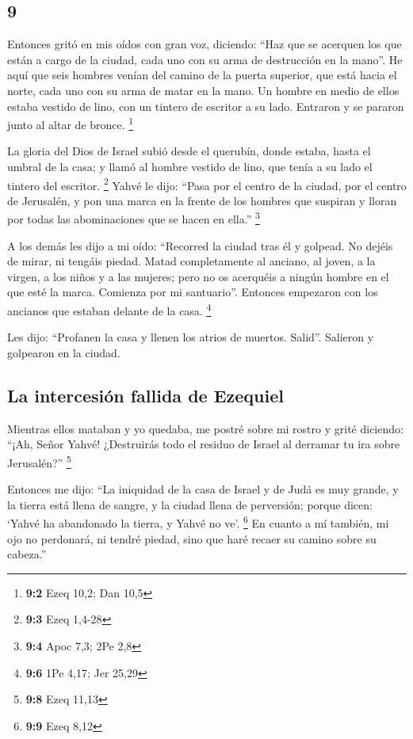 \begin{paracol}{2}
\hypertarget{section-16}{%
\section{9}\label{section-16}}

 Entonces gritó en mis oídos con gran voz, diciendo: ``Haz
que se acerquen los que están a cargo de la ciudad, cada uno con su arma
de destrucción en la mano''.  He aquí que seis hombres
venían del camino de la puerta superior, que está hacia el norte, cada
uno con su arma de matar en la mano. Un hombre en medio de ellos estaba
vestido de lino, con un tintero de escritor a su lado. Entraron y se
pararon junto al altar de bronce. \footnote{\textbf{9:2} Ezeq 10,2; Dan
  10,5}

 La gloria del Dios de Israel subió desde el querubín,
donde estaba, hasta el umbral de la casa; y llamó al hombre vestido de
lino, que tenía a su lado el tintero del escritor. \footnote{\textbf{9:3}
  Ezeq 1,4-28}  Yahvé le dijo: ``Pasa por el centro de la
ciudad, por el centro de Jerusalén, y pon una marca en la frente de los
hombres que suspiran y lloran por todas las abominaciones que se hacen
en ella.'' \footnote{\textbf{9:4} Apoc 7,3; 2Pe 2,8}

 A los demás les dijo a mi oído: ``Recorred la ciudad tras
él y golpead. No dejéis de mirar, ni tengáis piedad. 
Matad completamente al anciano, al joven, a la virgen, a los niños y a
las mujeres; pero no os acerquéis a ningún hombre en el que esté la
marca. Comienza por mi santuario''. Entonces empezaron con los ancianos
que estaban delante de la casa. \footnote{\textbf{9:6} 1Pe 4,17; Jer
  25,29}

 Les dijo: ``Profanen la casa y llenen los atrios de
muertos. Salid''. Salieron y golpearon en la ciudad.

\hypertarget{la-intercesiuxf3n-fallida-de-ezequiel}{%
\subsection{La intercesión fallida de
Ezequiel}\label{la-intercesiuxf3n-fallida-de-ezequiel}}

 Mientras ellos mataban y yo quedaba, me postré sobre mi
rostro y grité diciendo: ``¡Ah, Señor Yahvé! ¿Destruirás todo el residuo
de Israel al derramar tu ira sobre Jerusalén?'' \footnote{\textbf{9:8}
  Ezeq 11,13}

 Entonces me dijo: ``La iniquidad de la casa de Israel y
de Judá es muy grande, y la tierra está llena de sangre, y la ciudad
llena de perversión; porque dicen: `Yahvé ha abandonado la tierra, y
Yahvé no ve'. \footnote{\textbf{9:9} Ezeq 8,12}  En
cuanto a mí también, mi ojo no perdonará, ni tendré piedad, sino que
haré recaer su camino sobre su cabeza.''


\end{paracol}
